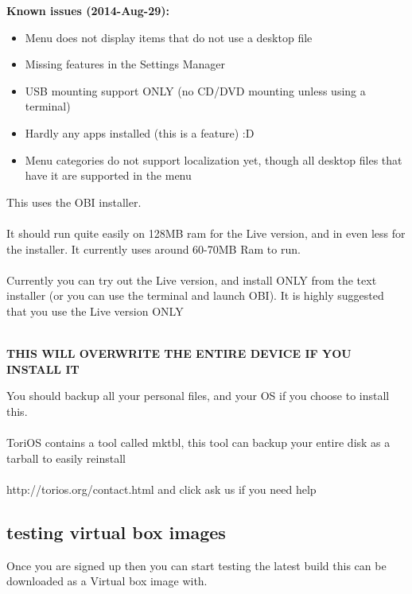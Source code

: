 \documentclass[12pt,a4paper]{book}
\begin{document}
\textbf{Known issues (2014-Aug-29):}
\begin{itemize}
\item{Menu does not display items that do not use a desktop file}  
\item{Missing features in the Settings Manager}
\item{USB mounting support ONLY (no CD/DVD mounting unless using a terminal)}
\item{Hardly any apps installed (this is a feature) :D}
\item{Menu categories do not support localization yet, though all desktop files that have it are supported in the menu}
\end{itemize}

This uses the OBI installer. \\ \\
It should run quite easily on 128MB ram for the Live version, and in even less for the installer.  It currently uses around 60-70MB Ram to run. \\ \\
Currently you can try out the Live version, and install ONLY from the text installer (or you can use the terminal and launch OBI).
It is highly suggested that you use the Live version ONLY \\ \\

\begin{center}

\textbf{THIS WILL OVERWRITE THE ENTIRE DEVICE IF YOU 
INSTALL IT} \\

\end{center}

You should backup all your  personal files, and your OS if you choose to install this.\\ \\
ToriOS contains a tool called mktbl, this tool can backup your entire disk as a tarball to easily reinstall \\ \\
http://torios.org/contact.html and click ask us if you need help \\
 
\newpage

\subsection {testing virtual box images}
Once you are signed up then you can start testing the latest build this can be downloaded as a Virtual box image with.
\end{document}
